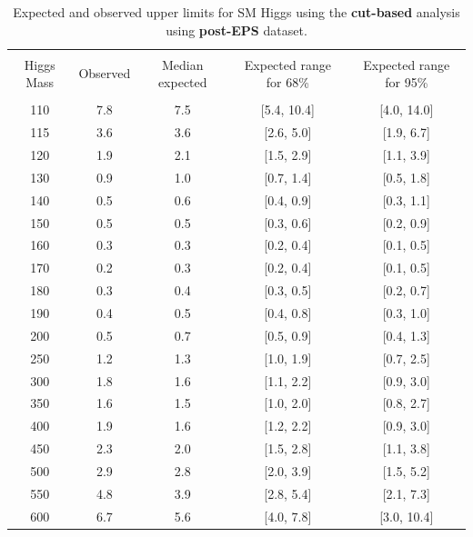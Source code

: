 \begin{table}[hbp!]
\begin{center}
\begin{tabular}{c c c c c}
\hline
\vspace{-3mm} && \\
 Higgs Mass   & Observed & Median expected & Expected range for 68\% & Expected range for 95\%   \\
\vspace{-3mm} && \\
\hline
110 & 7.8 & 7.5 & [5.4, 10.4] & [4.0, 14.0] \\
115 & 3.6 & 3.6 & [2.6, 5.0] & [1.9, 6.7] \\
120 & 1.9 & 2.1 & [1.5, 2.9] & [1.1, 3.9] \\
130 & 0.9 & 1.0 & [0.7, 1.4] & [0.5, 1.8] \\
140 & 0.5 & 0.6 & [0.4, 0.9] & [0.3, 1.1] \\
150 & 0.5 & 0.5 & [0.3, 0.6] & [0.2, 0.9] \\
160 & 0.3 & 0.3 & [0.2, 0.4] & [0.1, 0.5] \\
170 & 0.2 & 0.3 & [0.2, 0.4] & [0.1, 0.5] \\
180 & 0.3 & 0.4 & [0.3, 0.5] & [0.2, 0.7] \\
190 & 0.4 & 0.5 & [0.4, 0.8] & [0.3, 1.0] \\
200 & 0.5 & 0.7 & [0.5, 0.9] & [0.4, 1.3] \\
250 & 1.2 & 1.3 & [1.0, 1.9] & [0.7, 2.5] \\
300 & 1.8 & 1.6 & [1.1, 2.2] & [0.9, 3.0] \\
350 & 1.6 & 1.5 & [1.0, 2.0] & [0.8, 2.7] \\
400 & 1.9 & 1.6 & [1.2, 2.2] & [0.9, 3.0] \\
450 & 2.3 & 2.0 & [1.5, 2.8] & [1.1, 3.8] \\
500 & 2.9 & 2.8 & [2.0, 3.9] & [1.5, 5.2] \\
550 & 4.8 & 3.9 & [2.8, 5.4] & [2.1, 7.3] \\
600 & 6.7 & 5.6 & [4.0, 7.8] & [3.0, 10.4] \\
\hline
\end{tabular}
\caption{Expected and observed upper limits for SM Higgs using the
  {\bf cut-based} analysis using {\bf post-EPS} dataset.}
\label{tab:cutbase_uls_posteps}
\end{center}
\end{table}

